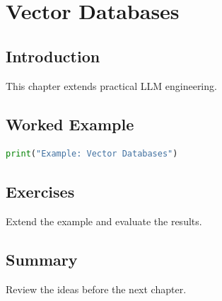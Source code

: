 \chapter{Vector Databases}
\label{chap:vol9-13}



\section{Introduction}
This chapter extends practical LLM engineering.

\section{Worked Example}
\begin{lstlisting}[language=Python]
print("Example: Vector Databases")
\end{lstlisting}

\section{Exercises}
\begin{exercise}
Extend the example and evaluate the results.
\end{exercise}

\section{Summary}
Review the ideas before the next chapter.
